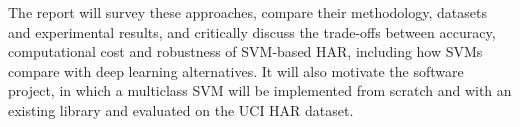 \documentclass[3p,times,procedia]{elsarticle}
\begin{document}
The report will survey these approaches, compare their methodology, datasets and experimental results, and critically discuss the trade-offs between accuracy, computational cost and robustness of SVM-based HAR, including how SVMs compare with deep learning alternatives. It will also motivate the software project, in which a multiclass SVM will be implemented from scratch and with an existing library and evaluated on the UCI HAR dataset.



\footnotesize{




} 
\end{document}
